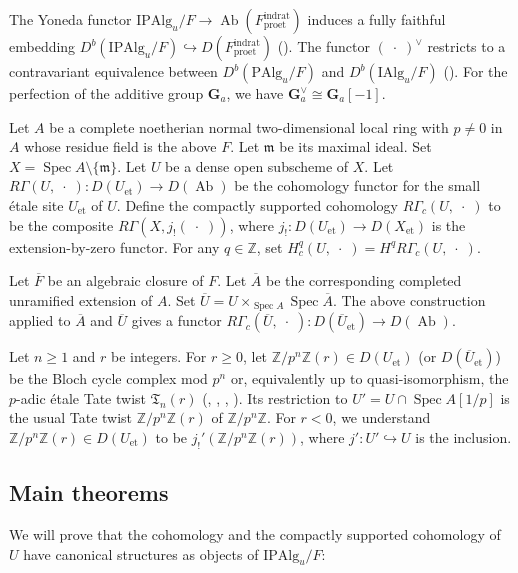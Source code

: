 \documentclass{amsart}
\theoremstyle{remark}
\numberwithin{equation}{subsection}
\newcommand{\into}{\hookrightarrow}
\newcommand{\closure}[1]{\overline{#1}}
\newcommand{\Z}{\mathbb{Z}}
\newcommand{\et}{\mathrm{et}}
\newcommand{\Ga}{\mathbf{G}_{a}}
\newcommand{\rat}{\mathrm{rat}}
\newcommand{\ind}{\mathrm{ind}}
\newcommand{\pro}{\mathrm{pro}}
\newcommand{\Alg}{\mathrm{Alg}}
\newcommand{\Ind}{\mathrm{I}}
\newcommand{\Pro}{\mathrm{P}}
\newcommand{\var}{\;\cdot\;}
\newcommand{\ideal}[1]{\mathfrak{#1}}
\DeclareMathOperator{\Spec}{Spec}
\DeclareMathOperator{\Ab}{Ab}
\begin{document}
The Yoneda functor $\Ind \Pro \Alg_{u} / F \to \Ab(F^{\ind\rat}_{\pro\et})$
induces a fully faithful embedding
$D^{b}(\Ind \Pro \Alg_{u} / F) \into D(F^{\ind\rat}_{\pro\et})$
(\cite[Proposition 2.3.4]{Suz20}).
The functor $(\var)^{\vee}$ restricts to a contravariant equivalence between
$D^{b}(\Pro \Alg_{u} / F)$ and $D^{b}(\Ind \Alg_{u} / F)$
(\cite[Proposition 2.4.1 (b)]{Suz20}).
For the perfection of the additive group $\Ga$,
we have $\Ga^{\vee} \cong \Ga[-1]$.

Let $A$ be a complete noetherian normal two-dimensional local ring with $p \ne 0$ in $A$
whose residue field is the above $F$.
Let $\ideal{m}$ be its maximal ideal.
Set $X = \Spec A \setminus \{\ideal{m}\}$.
Let $U$ be a dense open subscheme of $X$.
Let $R \Gamma(U, \var) \colon D(U_{\et}) \to D(\Ab)$ be
the cohomology functor for the small \'etale site $U_{\et}$ of $U$.
Define the compactly supported cohomology $R \Gamma_{c}(U, \var)$ to be
the composite $R \Gamma(X, j_{!}(\var))$,
where $j_{!} \colon D(U_{\et}) \to D(X_{\et})$
is the extension-by-zero functor.
For any $q \in \Z$, set $H^{q}_{c}(U, \var) = H^{q} R \Gamma_{c}(U, \var)$.

Let $\closure{F}$ be an algebraic closure of $F$.
Let $\closure{A}$ be the corresponding completed unramified extension of $A$.
Set $\closure{U} = U \times_{\Spec A} \Spec \closure{A}$.
The above construction applied to $\closure{A}$ and $\closure{U}$ gives a functor
$R \Gamma_{c}(\closure{U}, \var) \colon D(\closure{U}_{\et}) \to D(\Ab)$.

Let $n \ge 1$ and $r$ be integers.
For $r \ge 0$,
let $\Z / p^{n} \Z(r) \in D(U_{\et})$ (or $D(\closure{U}_{\et})$) be
the Bloch cycle complex mod $p^{n}$
or, equivalently up to quasi-isomorphism,
the $p$-adic \'etale Tate twist $\mathfrak{T}_{n}(r)$
(\cite{Sch94}, \cite{Gei04Ded}, \cite{Sat07}, \cite{Sat13}).
Its restriction to $U' = U \cap \Spec A[1 / p]$ is
the usual Tate twist $\Z / p^{n} \Z(r)$ of $\Z / p^{n} \Z$.
For $r < 0$, we understand $\Z / p^{n} \Z(r) \in D(U_{\et})$ to be
$j_{!}'(\Z / p^{n} \Z(r))$,
where $j' \colon U' \into U$ is the inclusion.


\subsection{Main theorems}
\label{0127}

We will prove that the cohomology and the compactly supported cohomology of $U$ have
canonical structures as objects of $\Ind \Pro \Alg_{u} / F$:
\end{document}
